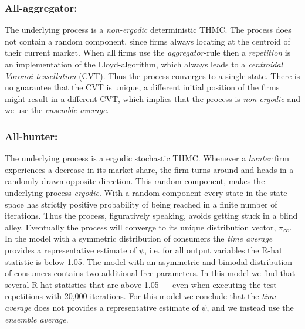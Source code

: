 \documentclass[preprint, 12pt]{elsarticle}
\begin{document}
\subsubsection*{All-aggregator:}
The underlying process is a \emph{non-ergodic} deterministic THMC. The process does not contain a random component, since firms always locating at the centroid of their current market. When all firms use the \emph{aggregator}-rule then a \emph{repetition} is an implementation of the Lloyd-algorithm, which always leads to a \emph{centroidal Voronoi tessellation} (CVT). Thus the process converges to a single state. There is no guarantee that the CVT is unique, a different initial position of the firms might result in a different CVT, which implies that the process is \emph{non-ergodic} and we use the \emph{ensemble average}.

\subsubsection*{All-hunter:}
The underlying process is a ergodic stochastic THMC. Whenever a \emph{hunter} firm experiences a decrease in its market share, the firm turns around and heads in a randomly drawn opposite direction. This random component, makes the underlying process \emph{ergodic}. With a random component every state in the state space has strictly positive probability of being reached in a finite number of iterations. Thus the process, figuratively speaking, avoids getting stuck in a blind alley. Eventually the process will converge to its unique distribution vector, $\pi_\infty$. In the model with a symmetric distribution of consumers the \emph{time average} provides a representative estimate of $\psi$, i.e. for all output variables the R-hat statistic is below 1.05. The model with an asymmetric and bimodal distribution of consumers contains two additional free parameters. In this model we find that several R-hat statistics that are above 1.05 — even when executing the test repetitions with 20,000 iterations. For this model we conclude that the \emph{time average} does not provides a representative estimate of $\psi$, and we instead use the \emph{ensemble average}. 
\end{document}
